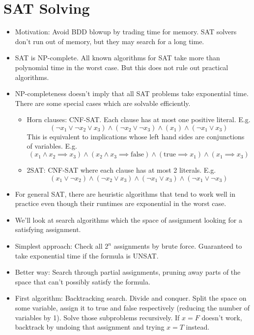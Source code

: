 \documentclass{article}
\begin{document}
\section*{SAT Solving}
\begin{itemize}
    \item Motivation: Avoid BDD blowup by trading time for memory. SAT solvers don't run out of memory, but they may search for a long time.
    \item SAT is NP-complete. All known algorithms for SAT take more than polynomial time in the worst case. But this does not rule out practical algorithms.
    \item NP-completeness doesn't imply that all SAT problems take exponential time. There are some special cases which are solvable efficiently.
    \begin{itemize}
        \item Horn clauses: CNF-SAT. Each clause has at most one positive literal. E.g. \[(\neg x_1 \lor \neg x_2 \lor x_3) \land (\neg x_2 \lor \neg x_3) \land (x_1) \land (\neg x_1 \lor x_3)\]
        This is equivalent to implications whose left hand sides are conjunctions of variables. E.g. \[(x_1 \land x_2 \implies x_3) \land (x_2 \land x_3 \implies \text{false}) \land (\text{true} \implies x_1) \land (x_1 \implies x_3)\]
        \item 2SAT: CNF-SAT where each clause has at most 2 literals. E.g. \[(x_1 \lor \neg x_2) \land (\neg x_2 \lor x_3) \land (\neg x_1 \lor x_3) \land (\neg x_1 \lor \neg x_3)\]
    \end{itemize}
    \item For general SAT, there are heuristic algorithms that tend to work well in practice even though their runtimes are exponential in the worst case.
    \item We'll look at search algorithms which the space of assignment looking for a satisfying assignment.
    \item Simplest approach: Check all $2^n$ assignments by brute force. Guaranteed to take exponential time if the formula is UNSAT.
    \item Better way: Search through partial assignments, pruning away parts of the space that can't possibly satisfy the formula.
    \item First algorithm: Backtracking search. Divide and conquer. Split the space on some variable, assign it to true and false respectively (reducing the number of variables by 1). Solve those subproblems recursively. If $x=F$ doesn't work, backtrack by undoing that assignment and trying $x=T$ instead.

\end{itemize}
\end{document}
